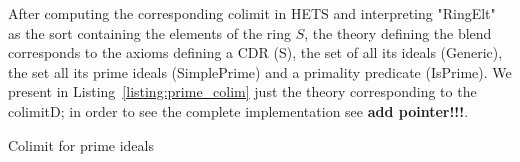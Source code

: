 After computing the corresponding colimit in HETS and interpreting
"RingElt" as the sort containing the elements of the ring $S$, the
theory defining the blend corresponds to the axioms defining a CDR
(S), the set of all its ideals (Generic), the set all its prime ideals
(SimplePrime) and a primality predicate (IsPrime).  We present 
in Listing~\ref{listing:prime_colim}
just the theory corresponding to the colimitD; in order to see the
complete implementation see \textbf{add pointer!!!}.

% 
  \begin{listing}[!ht]
    \begin{mdframed}
     \begin{footnotesize}
      
    \end{footnotesize}
  \end{mdframed}
    \caption{Colimit for prime ideals}
    \label{listing:prime_colim}
  \end{listing}


